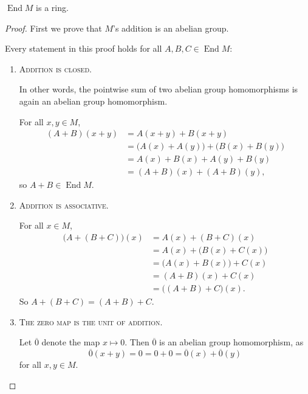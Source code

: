 \documentclass{article}
\newcommand*\End{\ensuremath{\operatorname{End}}}
\begin{document}
\begin{theorem}
    \label{thm:EndMIsARing}
    $\End M$ is a ring.
\end{theorem}
\begin{proof}
    First we prove that $M$'s addition is an abelian group.

    Every statement in this proof holds for all $A, B, C \in \End M$:
    \begin{enumerate}
        \item
            \textsc{\color{Crimson} Addition is closed.}

            In other words, the pointwise sum of two abelian group homomorphisms is again an abelian group homomorphism.

            For all $x,y \in M$,
            \begin{align*}
                (A+B)(x+y)
                &=
                A(x+y) + B(x+y) \\
                &=
                \big(A(x)+A(y)\big) + \big(B(x)+B(y)\big) \\
                &=
                A(x) + B(x) + A(y) + B(y) \\
                &=
                (A+B)(x) + (A+B)(y),
            \end{align*}
            so $A+B \in \End M$.
        \item
            \textsc{\color{Crimson} Addition is associative.}

            For all $x \in M$,
            \begin{align*}
                \big(A + (B+C)\big)(x)
                &= 
                A(x) + (B+C)(x) \\
                &=
                A(x) + \big(B(x) + C(x)\big) \\
                &=
                \big(A(x) + B(x)\big) + C(x) \\
                &=
                (A+B)(x) + C(x) \\
                &=
                \big((A+B)+C\big)(x).
            \end{align*}
            So $A+(B+C) = (A+B)+C$.
        \item 
            \textsc{\color{Crimson} The zero map is the unit of addition.}

            Let $\overline0$ denote the map $x \mapsto 0$.
            Then $\overline0$ is an abelian group homomorphism, as
            \[
                \overline0(x + y)
                =
                0
                =
                0 + 0
                =
                \overline0(x) + \overline0(y)
            \]
            for all $x, y \in M$.


\end{enumerate}
\end{proof}
\end{document}

